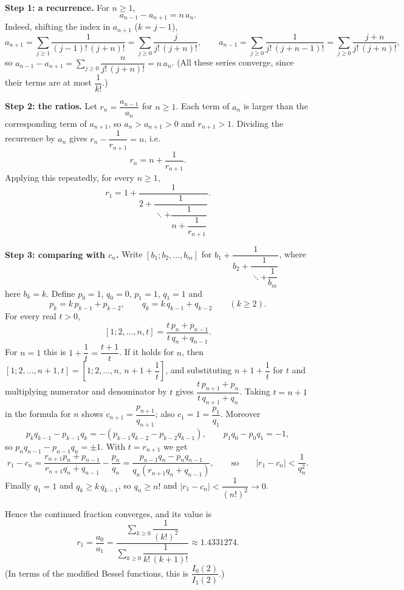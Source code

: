 \textbf{Step 1: a recurrence.} For $n\ge1$,
\[a_{n-1}-a_{n+1}=n\,a_n.\]
Indeed, shifting the index in $a_{n+1}$ ($k=j-1$),
\[a_{n+1}=\sum_{j\ge1}\dfrac{1}{(j-1)!\,(j+n)!}=\sum_{j\ge0}\dfrac{j}{j!\,(j+n)!},\qquad a_{n-1}=\sum_{j\ge0}\dfrac{1}{j!\,(j+n-1)!}=\sum_{j\ge0}\dfrac{j+n}{j!\,(j+n)!},\]
so $a_{n-1}-a_{n+1}=\sum_{j\ge0}\dfrac{n}{j!\,(j+n)!}=n\,a_n$. (All these series converge, since their terms are at most $\dfrac{1}{k!}$.)

\textbf{Step 2: the ratios.} Let $r_n=\dfrac{a_{n-1}}{a_n}$ for $n\ge1$. Each term of $a_n$ is larger than the corresponding term of $a_{n+1}$, so $a_n>a_{n+1}>0$ and $r_{n+1}>1$. Dividing the recurrence by $a_n$ gives $r_n-\dfrac{1}{r_{n+1}}=n$, i.e.
\[r_n=n+\dfrac{1}{r_{n+1}}.\]
Applying this repeatedly, for every $n\ge1$,
\[r_1=1+\dfrac{1}{2+\dfrac{1}{\ddots+\dfrac{1}{n+\dfrac{1}{r_{n+1}}}}}.\]

\textbf{Step 3: comparing with $c_n$.} Write $[b_1;b_2,\dots,b_m]$ for $b_1+\dfrac{1}{b_2+\dfrac{1}{\ddots+\dfrac{1}{b_m}}}$, where here $b_k=k$. Define $p_0=1$, $q_0=0$, $p_1=1$, $q_1=1$ and
\[p_k=k\,p_{k-1}+p_{k-2},\qquad q_k=k\,q_{k-1}+q_{k-2}\qquad(k\ge2).\]
For every real $t>0$,
\[[1;2,\dots,n,t]=\dfrac{t\,p_n+p_{n-1}}{t\,q_n+q_{n-1}}.\]
For $n=1$ this is $1+\dfrac1t=\dfrac{t+1}{t}$. If it holds for $n$, then $[1;2,\dots,n+1,t]=[1;2,\dots,n,\,n+1+\dfrac1t]$, and substituting $n+1+\dfrac1t$ for $t$ and multiplying numerator and denominator by $t$ gives $\dfrac{t\,p_{n+1}+p_n}{t\,q_{n+1}+q_n}$. Taking $t=n+1$ in the formula for $n$ shows $c_{n+1}=\dfrac{p_{n+1}}{q_{n+1}}$; also $c_1=1=\dfrac{p_1}{q_1}$. Moreover
\[p_kq_{k-1}-p_{k-1}q_k=-\left(p_{k-1}q_{k-2}-p_{k-2}q_{k-1}\right),\qquad p_1q_0-p_0q_1=-1,\]
so $p_nq_{n-1}-p_{n-1}q_n=\pm1$. With $t=r_{n+1}$ we get
\[r_1-c_n=\dfrac{r_{n+1}p_n+p_{n-1}}{r_{n+1}q_n+q_{n-1}}-\dfrac{p_n}{q_n}=\dfrac{p_{n-1}q_n-p_nq_{n-1}}{q_n\left(r_{n+1}q_n+q_{n-1}\right)},\qquad\text{so}\qquad|r_1-c_n|<\dfrac{1}{q_n^2}.\]
Finally $q_1=1$ and $q_k\ge k\,q_{k-1}$, so $q_n\ge n!$ and $|r_1-c_n|<\dfrac{1}{(n!)^2}\to0$.

Hence the continued fraction converges, and its value is
\[\boxed{r_1=\dfrac{a_0}{a_1}=\dfrac{\displaystyle\sum_{k\ge0}\dfrac{1}{(k!)^2}}{\displaystyle\sum_{k\ge0}\dfrac{1}{k!\,(k+1)!}}}\approx1.4331274.\]
(In terms of the modified Bessel functions, this is $\dfrac{I_0(2)}{I_1(2)}$.)
